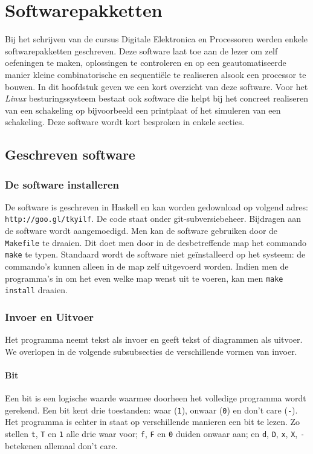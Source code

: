 \chapter{Softwarepakketten}
\begin{chapterintro}
Bij het schrijven van de cursus Digitale Elektronica en Processoren werden enkele softwarepakketten geschreven. Deze software laat toe aan de lezer om zelf oefeningen te maken, oplossingen te controleren en op een geautomatiseerde manier kleine combinatorische en sequenti\"ele te realiseren alsook een processor te bouwen. In dit hoofdstuk geven we een kort overzicht van deze software. Voor het \emph{Linux} besturingssysteem bestaat ook software die helpt bij het concreet realiseren van een schakeling op bijvoorbeeld een printplaat of het simuleren van een schakeling. Deze software wordt kort besproken in enkele secties.
\end{chapterintro}
\minitoc[n]
\section{Geschreven software}
\subsection{De software installeren}
De software is geschreven in Haskell en kan worden gedownload op volgend adres: \texttt{http://goo.gl/tkyilf}. De code staat onder git-subversiebeheer. Bijdragen aan de software wordt aangemoedigd. Men kan de software gebruiken door de \texttt{Makefile} te draaien. Dit doet men door in de desbetreffende map het commando \texttt{make} te typen. Standaard wordt de software niet ge\"installeerd op het systeem: de commando's kunnen alleen in de map zelf uitgevoerd worden. Indien men de programma's in om het even welke map wenst uit te voeren, kan men \texttt{make install} draaien.
\subsection{Invoer en Uitvoer}
Het programma neemt tekst als invoer en geeft tekst of diagrammen als uitvoer. We overlopen in de volgende subsubsecties de verschillende vormen van invoer.
\subsubsection{Bit}
Een bit is een logische waarde waarmee doorheen het volledige programma wordt gerekend. Een bit kent drie toestanden: waar (\texttt{1}), onwaar (\texttt{0}) en don't care (\texttt{-}). Het programma is echter in staat op verschillende manieren een bit te lezen. Zo stellen \texttt{t}, \texttt{T} en \texttt{1} alle drie waar voor; \texttt{f}, \texttt{F} en \texttt{0} duiden onwaar aan; en \texttt{d}, \texttt{D}, \texttt{x}, \texttt{X}, \texttt{-} betekenen allemaal don't care.
